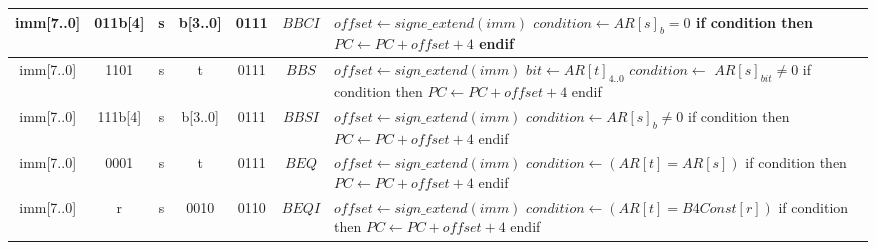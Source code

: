 \begin{longtable}{llllllllllllllllllllllll  p{1cm}  p{7cm} | }
		\multicolumn{8}{|c|}{imm[7..0]} & \multicolumn{4}{c|}{011b[4]} & \multicolumn{4}{c|}{s} & \multicolumn{4}{c|}{b[3..0]} & \multicolumn{4}{c|}{0111} & \multicolumn{1}{c|}{$BBCI$} & $offset \leftarrow signe\_extend(imm)$ \newline $condition \leftarrow AR[s]_{b} = 0$ \newline if condition then \newline $PC \leftarrow PC + offset + 4$ \newline endif\\ \hline
		\multicolumn{8}{|c|}{imm[7..0]} & \multicolumn{4}{c|}{1101} & \multicolumn{4}{c|}{s} & \multicolumn{4}{c|}{t} & \multicolumn{4}{c|}{0111} & \multicolumn{1}{c|}{$BBS$} & $offset \leftarrow sign\_extend(imm)$ \newline $bit \leftarrow AR[t]_{4..0}$ \newline $condition \leftarrow$ $AR[s]_{bit} \neq 0$ \newline if condition then \newline $PC \leftarrow PC + offset + 4$ \newline endif\\ \hline
		\multicolumn{8}{|c|}{imm[7..0]} & \multicolumn{4}{c|}{111b[4]} & \multicolumn{4}{c|}{s} & \multicolumn{4}{c|}{b[3..0]} & \multicolumn{4}{c|}{0111} & \multicolumn{1}{c|}{$BBSI$} & $offset \leftarrow sign\_extend(imm)$ \newline $condition \leftarrow AR[s]_{b} \neq 0$ \newline if condition then \newline $PC \leftarrow PC + offset + 4$ \newline endif\\ \hline
		\multicolumn{8}{|c|}{imm[7..0]} & \multicolumn{4}{c|}{0001} & \multicolumn{4}{c|}{s} & \multicolumn{4}{c|}{t} & \multicolumn{4}{c|}{0111} & \multicolumn{1}{c|}{$BEQ$} & $offset \leftarrow sign\_extend(imm)$ \newline $condition \leftarrow (AR[t]=AR[s])$ \newline if condition then \newline $PC \leftarrow PC + offset + 4$ \newline endif\\ \hline
		\multicolumn{8}{|c|}{imm[7..0]} & \multicolumn{4}{c|}{r} & \multicolumn{4}{c|}{s} & \multicolumn{4}{c|}{0010} & \multicolumn{4}{c|}{0110} & \multicolumn{1}{c|}{$BEQI$} & $offset \leftarrow sign\_extend(imm)$ \newline $condition \leftarrow (AR[t] = B4Const[r])$ \newline if condition then \newline $PC \leftarrow PC + offset + 4$ \newline endif\\ \hline


\end{longtable}
